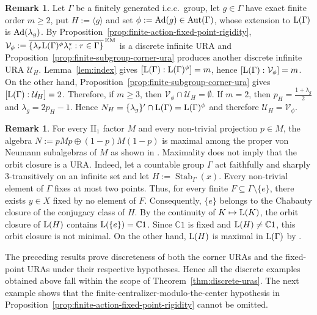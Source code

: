 \documentclass[12pt]{amsart} %
\theoremstyle{plain}
\theoremstyle{definition}
\newtheorem{remark}[theorem]{Remark}
\newcommand{\C}{\mathbb{C}}
\newcommand{\LL}{{\rm L}}
\newcommand{\Aut}{{\rm Aut}}
\newcommand{\Ad}{{\rm Ad}}
\begin{document}
\begin{remark}\label{rmk:fixed-point-corner-index-comparison}
Let $\Gamma$ be a finitely generated i.c.c.\ group, let $g\in\Gamma$ have exact finite order
$m\geq2$, put $H:=\langle g\rangle$ and set
$\phi:=\Ad(g)\in\Aut(\Gamma)$, whose extension to $\LL(\Gamma)$ is
$\Ad(\lambda_g)$. By Proposition~\ref{prop:finite-action-fixed-point-rigidity}, $\mathcal V_\phi:=\overline{\{\lambda_r\LL(\Gamma)^\phi\lambda_r^*:r\in\Gamma\}}^{\,\mathrm{EM}}$ is a discrete infinite URA and Proposition~\ref{prop:finite-subgroup-corner-ura} produces another discrete infinite URA $\mathcal U_H$. Lemma~\ref{lem:index} 
gives $[\LL(\Gamma):\LL(\Gamma)^\phi]=m$, hence $[\LL(\Gamma):\mathcal V_\phi]=m$. On the other hand, Proposition~\ref{prop:finite-subgroup-corner-ura} gives $[\LL(\Gamma):\mathcal U_H]=2$. Therefore, if $m\geq3$, then $\mathcal V_\phi\cap\mathcal U_H=\emptyset$. If $m=2$, then
$p_H=\frac{1+\lambda_g}{2}$ and $\lambda_g=2p_H-1$.
Hence $
N_H=\{\lambda_g\}'\cap\LL(\Gamma)
=\LL(\Gamma)^\phi$
and therefore $\mathcal U_H=\mathcal V_\phi$.
\end{remark}
\begin{remark}
For every $\mathrm{II}_1$ factor $M$ and every non-trivial
projection $p\in M$, the algebra $N:=pMp\oplus (1-p)M(1-p)$ is maximal among the proper von Neumann subalgebras of $M$ as shown in \cite[Proposition 3.4]{zhou_maximal_typeI}. 
Maximality does not imply that the orbit closure is a URA. Indeed, let
a countable group $\Gamma$ act faithfully and sharply
$3$-transitively on an
infinite set and let $H:=\operatorname{Stab}_\Gamma(x)$. Every non-trivial element
of $\Gamma$ fixes at most two points. Thus, for every finite
$F\subseteq \Gamma\setminus\{e\}$, there exists $y\in X$ fixed by no element of
$F$. Consequently, $\{e\}$ belongs to the Chabauty closure of the conjugacy
class of $H$. By the continuity of $K\mapsto\LL(K)$, the orbit closure of
$\LL(H)$ contains $\LL(\{e\})=\C1$. Since $\C1$ is fixed and
$\LL(H)\neq\C1$, this orbit closure is not minimal. On the other hand,
$\LL(H)$ is maximal in $\LL(\Gamma)$ by
\cite[Theorem A]{Zhou_maximal_triple-transitive}.
\end{remark}
\noindent The preceding results prove discreteness of both the corner
URAs and the fixed-point URAs under their respective hypotheses. Hence all
the discrete examples obtained above fall within the scope of
Theorem~\ref{thm:discrete-uras}. The next
example shows that the finite-centralizer-modulo-the-center hypothesis in
Proposition~\ref{prop:finite-action-fixed-point-rigidity} cannot be omitted.
\end{document}

